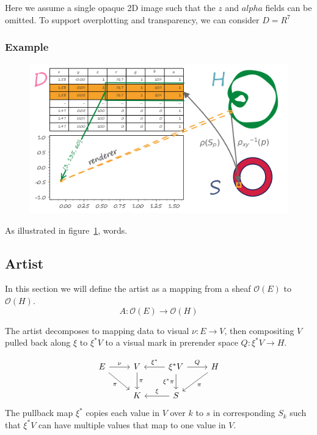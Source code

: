 \documentclass[../main.tex]{subfiles}
\begin{document}
Here we assume a single opaque 2D image such that the $z$ and $alpha$ fields can be omitted. To support overplotting and transparency, we can consider $D=R^{7}$

\subsubsection{{Example}}
\begin{figure}[H]
    \includegraphics[width=.4\linewidth]{figures/math/render.png}
    \caption{}
    \label{fig:render}
\end{figure}

As illustrated in figure~\ref{fig:render}, words.

\subsection{Artist}
\label{sec:artist}

In this section we will define the artist as a mapping from a sheaf $\mathcal{O}(E)$  to $\mathcal{O}(H)$. 
\begin{equation}
    A: \mathcal{O}(E) \rightarrow \mathcal{O}(H)
\end{equation}

The artist decomposes to mapping data to visual $\nu:E\rightarrow V$, then  compositing $V$ pulled back along $\xi$ to $\xi^*V$ to a visual mark in prerender space $Q:\xi^*V\rightarrow H$. 

\begin{equation}
    \label{eq:artist}
    \begin{tikzcd}
        E \arrow[r, "\nu"] \arrow[rd, "\pi"'] & V \arrow[d, "\pi"] & \xi^*V \arrow[r, "Q"] \arrow[d, "\xi^*\pi"'] \arrow[l, "\xi^*"'] & H \arrow[ld, "\pi"] \\
                                              & K                  & S \arrow[l, "\xi"']                                              &                    
        \end{tikzcd}
\end{equation}
The pullback map $\xi^*$ copies each value in $V$ over $k$ to $s$ in corresponding $S_k$ such that $\xi^*V$ can have multiple values that map to one value in $V$. 
\end{document}
